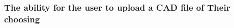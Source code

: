 \documentclass[letterpaper, 10pt, draftclsnofoot, onecolumn]{IEEEtran}
\begin{document}
{\begin{comment}
\paragraph[Input/Output sequence for this
feature]{\selectlanguage{english}\rmfamily\bfseries\color{black}
Input/Output sequence for this feature}
{\selectlanguage{english}\color{black} [ insert your text here ]}

\paragraph[Design constraints of this
feature]{\selectlanguage{english}\rmfamily\bfseries\color{black} Design
constraints of this feature}
{\selectlanguage{english}\color{black} [ insert your text here ]}

\paragraph[Performance requirements of this
feature]{\selectlanguage{english}\rmfamily\bfseries\color{black}
Performance requirements of this feature}
{\selectlanguage{english}\color{black} [ insert your text here ]}

\paragraph[Detailed functional requirements of this
feature]{\selectlanguage{english}\rmfamily\bfseries\color{black}
Detailed functional requirements of this feature}




\paragraph[]{\selectlanguage{english}\rmfamily\bfseries\color{black} }

\selectlanguage{english}\color{black} [ insert your text here ]\\\hline
\end{supertabular}
\end{flushleft}



\end{comment}



\bigskip

\subsubsection[{File upload}]{\rmfamily\bfseries\color{black}The ability for the user to upload a CAD file of Their choosing}
}
\end{document}
